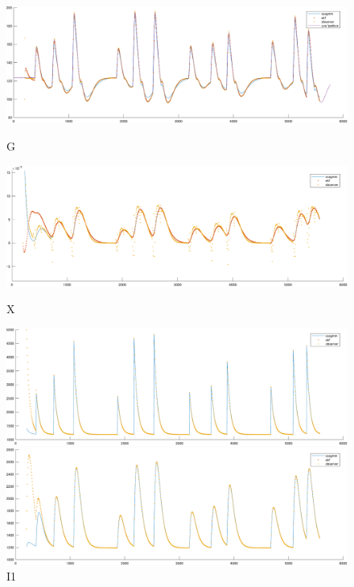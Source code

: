 \documentclass[platex]{jsarticle}
\begin{document}
\begin{figure}[H]
  \centering
  \begin{minipage}{0.65\columnwidth}
     \centering
     \includegraphics[width=\columnwidth]{fig/old002g.pdf}
     \caption{G}
     \label{fig:old002g}
  \end{minipage}
%
  \begin{minipage}{0.65\columnwidth}
     \centering
     \includegraphics[width=\columnwidth]{fig/old002x.pdf}
     \caption{X}
     \label{fig:old002x}
  \end{minipage}
%
  \begin{minipage}{0.65\columnwidth}
     \centering
     \includegraphics[width=\columnwidth]{fig/old002i1.pdf}
     \caption{I1}
     \label{fig:old002i1}
  \end{minipage}
%
  \begin{minipage}{0.65\columnwidth}
     \centering
     \includegraphics[width=\columnwidth]{fig/old002i2.pdf}

\end{minipage}
\end{figure}
\end{document}
